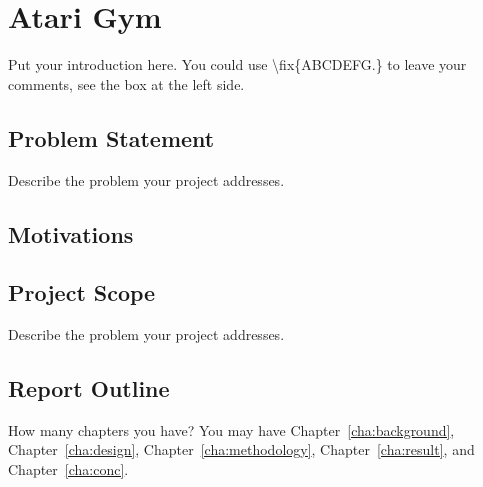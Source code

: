 \chapter{Atari Gym}
\label{cha:intro}

Put your introduction here. You could use \textbackslash fix\{ABCDEFG.\}
to leave your comments, see the box at the left side.



\section{Problem Statement}
\label{sec:problemstatement}
Describe the problem your project addresses.


\section{Motivations}
\label{sec:motivations}


\section{Project Scope}
\label{sec:projectscope}
Describe the problem your project addresses.


\section{Report Outline}
\label{sec:outline}

How many chapters you have? You may have Chapter~\ref{cha:background},
Chapter~\ref{cha:design}, Chapter~\ref{cha:methodology},
Chapter~\ref{cha:result}, and Chapter~\ref{cha:conc}.
